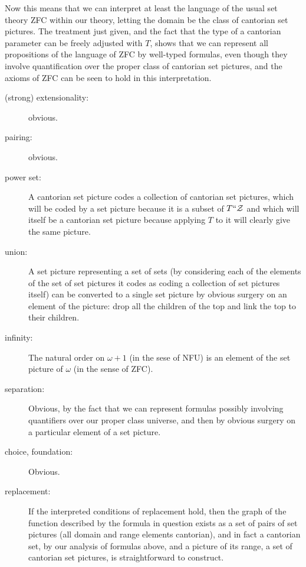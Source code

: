 \documentclass[12pt]{article}
\begin{document}
Now this means that we can interpret at least the language of the usual set theory ZFC within our theory, letting the domain be the class of cantorian set pictures.  The treatment just given, and the fact that the type of a cantorian parameter
can be freely adjusted with $T$, shows that we can represent all propositions of the language of ZFC by well-typed formulas, even though they involve quantification over the proper class of cantorian set pictures, and the axioms of ZFC can
be seen to hold in this interpretation.

\begin{description}

\item[(strong) extensionality:]  obvious.

\item[pairing:]  obvious.

\item[power set:]   A cantorian set picture codes a collection of cantorian set pictures, which will be coded by a set picture because it is a subset of $T``{\cal Z}$ and which will itself be a cantorian set picture because applying $T$ to it will clearly give the same picture.

\item[union:]  A set picture representing a set of sets (by considering each of the elements of the set of set pictures it codes as coding a collection of set pictures itself) can be converted to a single set picture by obvious surgery on an element of the picture:  drop all the children of the top and link the top to their children.

\item[infinity:]  The natural order on $\omega+1$ (in the sese of NFU) is an element of the set picture of $\omega$ (in the sense of ZFC).

\item[separation:]  Obvious, by the fact that we can represent formulas possibly involving quantifiers over our proper class universe, and then by obvious surgery on a particular element of a set picture.

\item[choice, foundation:]  Obvious.

\item[replacement:]  If the interpreted conditions of replacement hold, then the graph of the function described by the formula in question exists as a set of pairs of set pictures (all domain and range elements cantorian), and in fact a cantorian set, by our analysis of formulas above,
and a picture of its range, a set of cantorian set pictures, is straightforward to construct.

\end{description}
\end{document}
